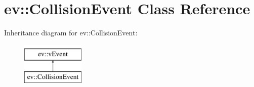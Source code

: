 \hypertarget{classev_1_1CollisionEvent}{}\section{ev\+:\+:Collision\+Event Class Reference}
\label{classev_1_1CollisionEvent}
Inheritance diagram for ev\+:\+:Collision\+Event\+:\begin{figure}[H]
\begin{center}
\leavevmode
\includegraphics[height=2.000000cm]{classev_1_1CollisionEvent}
\end{center}
\end{figure}
